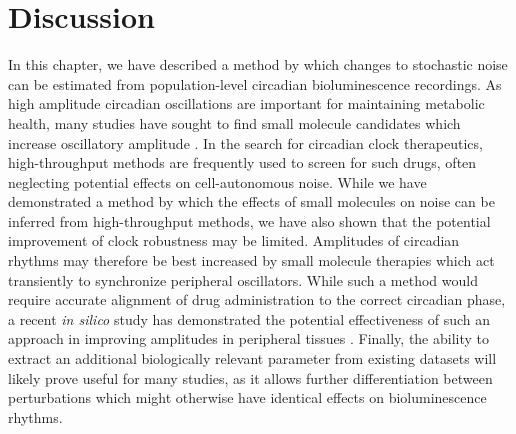 \section{Discussion}

In this chapter, we have described a method by which changes to stochastic noise can be estimated from population-level circadian bioluminescence recordings.
As high amplitude circadian oscillations are important for maintaining metabolic health, many studies have sought to find small molecule candidates which increase oscillatory amplitude \cite{Chen2013}.
In the search for circadian clock therapeutics, high-throughput methods are frequently used to screen for such drugs, often neglecting potential effects on cell-autonomous noise.
While we have demonstrated a method by which the effects of small molecules on noise can be inferred from high-throughput methods, we have also shown that the potential improvement of clock robustness may be limited.
Amplitudes of circadian rhythms may therefore be best increased by small molecule therapies which act transiently to synchronize peripheral oscillators.
While such a method would require accurate alignment of drug administration to the correct circadian phase, a recent {\itshape in silico} study has demonstrated the potential effectiveness of such an approach in improving amplitudes in peripheral tissues \cite{St.John2014a}.
Finally, the ability to extract an additional biologically relevant parameter from existing datasets will likely prove useful for many studies, as it allows further differentiation between perturbations which might otherwise have identical effects on bioluminescence rhythms.
